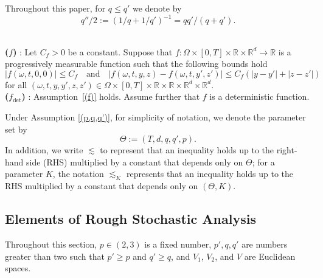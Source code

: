 \documentclass[11pt,reqno]{amsart}
\makeatletter
\newcommand{\cond}[2]{%
    \phantomsection
    \def\@currentlabel{(#1)}%
    \label{#2}%
    \textup{\bf(#1)}
} %
\newenvironment{assumptionp}[1]{
\renewcommand\theassumptionalt{#1}
\assumptionalt
}{\endassumptionalt}
\numberwithin{equation}{section}
\def\R{\mathbb R}
\makeatother
\begin{document}
Throughout this paper, for $q \le q'$ we denote by
\begin{equation*}
q''/2 := \left(1/q + 1/q'\right)^{-1} = qq'/(q + q').
\end{equation*}

\begin{assumptionp}{($\mathbf{A}_{\mathbf{f}}$)}
\noindent  \\[0.5em]
\cond{$f$}{(f)}: 
Let $C_f > 0$ be a constant. Suppose that $f: \Omega \times [0,T] \times \R \times \R^{d}\to \R$ is a progressively measurable function such that the following bounds hold 
\begin{equation*}
|f(\omega,t,0,0)| \le C_f \quad\text{and}\quad |f(\omega,t,y,z) - f(\omega,t,y',z')| \le C_f (|y-y'| + |z-z'|)
\end{equation*}
for all $(\omega,t,y,y',z,z') \in \Omega \times [0,T] \times \R \times \R \times \R^d \times \R^d$. \\[0.5em]
\noindent 
\cond{$f_{\mathrm{det}}$}{(fdet)}: 
Assumption~\ref{(f)} holds. Assume further that $f$ is a deterministic function. 
\end{assumptionp} 

Under Assumption \ref{(p,q,q')}, for simplicity of notation, we denote the parameter set by 
\begin{equation}\label{e:Theta}
\Theta := (T,d,q,q',p).
\end{equation}
In addition, we write $\lesssim$ to represent that an inequality holds up to the right-hand side (RHS) multiplied by a constant that depends only on $\Theta$; for a parameter $K$, the notation $\lesssim_{K}$ represents that an inequality holds up to the RHS multiplied by a constant that depends only on $(\Theta,K)$. 


\subsection{Elements of Rough Stochastic Analysis}\label{sec:rough sto analysis}
Throughout this section, $p\in(2,3)$ is a fixed number, $p',q,q'$ are  numbers greater than two such that $p'\ge p$ and $q'\ge q$, and $V_1$, $V_2$, and $V$ are Euclidean spaces.
\end{document}
